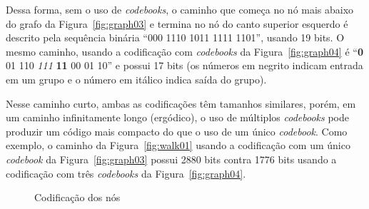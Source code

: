 \documentclass[12pt,a4paper]{article}
\begin{document}
Dessa forma, sem o uso de \textit{codebooks}, o caminho que começa no nó mais abaixo do grafo da Figura~\ref{fig:graph03} e termina no nó do canto superior esquerdo é descrito pela sequência binária \enquote{000 1110 1011 1111 1101}, usando 19 bits. O mesmo caminho, usando a codificação com \textit{codebooks} da Figura~\ref{fig:graph04} é \enquote{\textbf{0} 01 110 \textit{111} \textbf{11} 00 01 10} e possui 17 bits (os números em negrito indicam entrada em um grupo e o número em itálico indica saída do grupo).

Nesse caminho curto, ambas as codificações têm tamanhos similares, porém, em um caminho infinitamente longo (ergódico), o uso de múltiplos \textit{codebooks} pode produzir um código mais compacto do que o uso de um único \textit{codebook}. Como exemplo, o caminho da Figura~\ref{fig:walk01} usando a codificação com um único \textit{codebook} da Figura~\ref{fig:graph03} possui 2880 bits contra 1776 bits usando a codificação com três \textit{codebooks} da Figura~\ref{fig:graph04}.

\begin{figure}[ht]
    \centering
    \caption{Codificação dos nós}
\end{figure}
\end{document}

